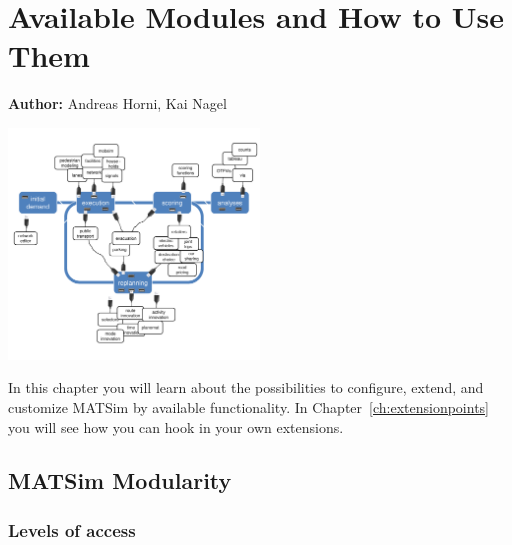 \chapter{Available Modules and How to Use Them}
\label{ch:modules}

\hfill \textbf{Author:} Andreas Horni, Kai Nagel

\begin{center} \includegraphics[width=0.5\textwidth, angle=0]{extending/figures/modules.pdf} \end{center}

In this chapter you will learn about the possibilities to configure, extend, and customize MATSim by available functionality. In Chapter~\ref{ch:extensionpoints} you will see how you can hook in your own extensions.


\section{MATSim Modularity}
\label{sec:matsim-modularity}

\subsection{Levels of access}
\label{sec:levels-of-access}

